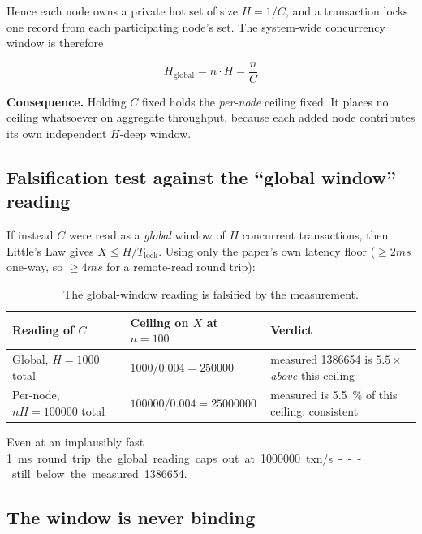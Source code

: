 \documentclass[11pt,a4paper]{article}
\newcommand{\hot}{C}
\newcommand{\tput}{\ensuremath{X}}
\begin{document}
Hence each node owns a private hot set of size $H = 1/\hot$, and a transaction
locks one record from each participating node's set.  The system-wide
concurrency window is therefore

$$\boxed{\;H_{\text{global}} = n \cdot H = \frac{n}{\hot}\;}$$

\noindent\textbf{Consequence.} Holding $\hot$ fixed holds the \emph{per-node}
ceiling fixed. It places no ceiling whatsoever on aggregate throughput, because
each added node contributes its own independent $H$-deep window.

\subsection{Falsification test against the ``global window'' reading}

If instead $\hot$ were read as a \emph{global} window of $H$ concurrent
transactions, then Little's Law gives
$\tput \le H/T_{\text{lock}}$. Using only the paper's own latency floor
($\ge\si{2} ms$ one-way, so $\ge\si{4} ms$ for a remote-read round trip):

\begin{table}[H]
\centering
\caption{The global-window reading is falsified by the measurement.}
\begin{tabular}{@{}>{\raggedright\arraybackslash}p{3.4cm}
                  >{\raggedright\arraybackslash}p{4.5cm}
                  >{\raggedright\arraybackslash}p{\dimexpr\textwidth-7.9cm-4\tabcolsep\relax}@{}}
\toprule
\textbf{Reading of \texorpdfstring{$\hot$}{C}} &
\textbf{Ceiling on $\tput$ at $n{=}100$} & \textbf{Verdict} \\
\midrule
Global, $H{=}1000$ total &
  $\num{1000}/0.004 = \num{250000}$ &
  measured \num{1386654} is $\mathbf{5.5\times}$ \emph{above} this ceiling \\
Per-node, $nH{=}100000$ total &
  $\num{100000}/0.004 = \num{25000000}$ &
  measured is \SI{5.5}{\percent} of this ceiling: consistent \\
\bottomrule
\end{tabular}
\end{table}

Even at an implausibly fast \SI{1} ms round trip the global reading caps out at
\num{1000000} txn/s --- still below the measured \num{1386654}.

\subsection{The window is never binding}
\end{document}

